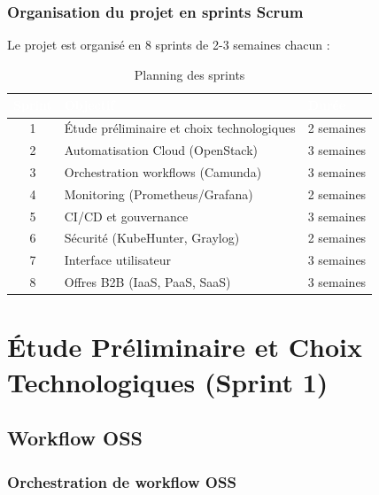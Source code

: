 \documentclass[12pt,a4paper,twoside]{report}
\begin{document}
\subsection{Organisation du projet en sprints Scrum}

Le projet est organisé en 8 sprints de 2-3 semaines chacun :

\begin{table}[H]
    \centering
    \caption{Planning des sprints}
    \label{tab:sprints}
    \begin{tabular}{|c|l|l|}
        \hline
        \rowcolor{orange!80}
        \textcolor{white}{\textbf{Sprint}} & \textcolor{white}{\textbf{Objectif}} & \textcolor{white}{\textbf{Durée}} \\
        \hline
        1 & Étude préliminaire et choix technologiques & 2 semaines \\
        2 & Automatisation Cloud (OpenStack) & 3 semaines \\
        3 & Orchestration workflows (Camunda) & 3 semaines \\
        4 & Monitoring (Prometheus/Grafana) & 2 semaines \\
        5 & CI/CD et gouvernance & 3 semaines \\
        6 & Sécurité (KubeHunter, Graylog) & 2 semaines \\
        7 & Interface utilisateur & 3 semaines \\
        8 & Offres B2B (IaaS, PaaS, SaaS) & 3 semaines \\
        \hline
    \end{tabular}
\end{table}

\newpage

\chapter{Étude Préliminaire et Choix Technologiques (Sprint 1)}

\section{Workflow OSS}

\subsection{Orchestration de workflow OSS}
\end{document}
